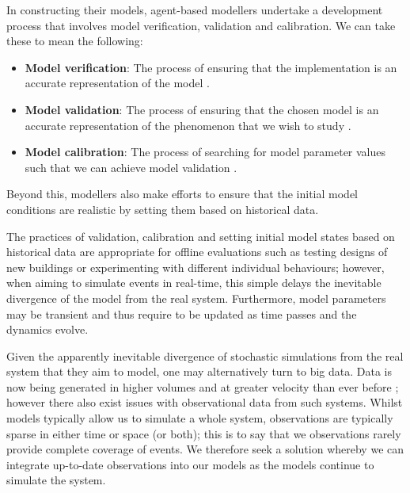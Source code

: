 \documentclass[12pt, twoside, a4paper]{article}
\begin{document}
In constructing their models, agent-based modellers undertake a development
process that involves model verification, validation and calibration.
We can take these to mean the following:
\begin{itemize}
    \item \textbf{Model verification}: The process of ensuring that the
        implementation is an accurate representation of the model
        \citep{xiang2005verification}.
    \item \textbf{Model validation}: The process of ensuring that the chosen
        model is an accurate representation of the phenomenon that we wish to
        study \citep{crooks2008key}.
    \item \textbf{Model calibration}: The process of searching for model
        parameter values such that we can achieve model validation
        \citep{thiele2014facilitating}.
\end{itemize}
Beyond this, modellers also make efforts to ensure that the initial model
conditions are realistic by setting them based on historical data.

The practices of validation, calibration and setting initial model states based
on historical data are appropriate for offline evaluations such as testing
designs of new buildings or experimenting with different individual behaviours;
however, when aiming to simulate events in real-time, this simple delays the
inevitable divergence of the model from the real system.
Furthermore, model parameters may be transient and thus require to be updated as
time passes and the dynamics evolve.

Given the apparently inevitable divergence of stochastic simulations from the
real system that they aim to model, one may alternatively turn to big data.
Data is now being generated in higher volumes and at greater velocity than ever
before \citep{chen2014big}; however there also exist issues with observational
data from such systems.
Whilst models typically allow us to simulate a whole system, observations are
typically sparse in either time or space (or both); this is to say that we
observations rarely provide complete coverage of events.
We therefore seek a solution whereby we can integrate up-to-date observations
into our models as the models continue to simulate the system.
\end{document}

